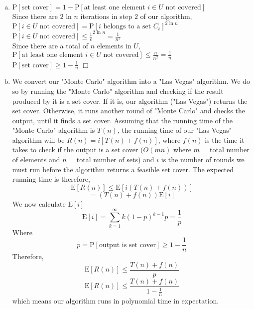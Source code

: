 \documentclass{article}[12pt]
\newenvironment{proof}{{\bf Proof.  }}{\hfill$\Box$}
\begin{document}
\begin{enumerate}[(a)]
\item
\begin{proof}
$\mathrm{P}[\text{set cover}] = 1 - \mathrm{P}[\text{at least one element } i \in U \text{ not covered}]$\\
Since there are $2$ ln $n$ iterations in step $2$ of our algorithm, \\
$\mathrm{P}[i \in U \text{ not covered}] = \mathrm{P}[i \text{ belongs to a set } C_t]^{2 \text{ ln }n}$\\
$\mathrm{P}[i \in U \text{ not covered}] \leq \frac{1}{e}^{2 \text{ ln } n} = \frac{1}{n^2}$\\
Since there are a total of $n$ elements in $U$,\\
$\mathrm{P}[\text{at least one element } i \in U \text{ not covered}] \leq \frac{n}{n^2} = \frac{1}{n}$\\
$\mathrm{P}[\text{set cover}] \geq 1 - \frac{1}{n}$
\end{proof}

\item
We convert our "Monte Carlo" algorithm into a "Las Vegas" algorithm. We do so by running the "Monte Carlo" algorithm and checking if the result produced by it is a set cover. If it is, our algorithm ("Las Vegas") returns the set cover. Otherwise, it runs another round of "Monte Carlo" and checks the output, until it finds a set cover. 
Assuming that the running time of the "Monte Carlo" algorithm is $T(n)$, the running time of our "Las Vegas" algorithm will be $R(n) = i[T(n) + f(n)]$, where $f(n)$ is the time it takes to check if the output is a set cover ($O(mn)$ where $m$ = total number of elements and $n$ = total number of sets) and $i$ is the number of rounds we must run before the algorithm returns a feasible set cover. 
The expected running time is therefore,
$$\mathrm{E}[R(n)] \leq \mathrm{E}[i(T(n) + f(n))]$$
$$= (T(n) + f(n))\mathrm{E}[i]$$
We now calculate $\mathrm{E}[i]$
$$\mathrm{E}[i] =  \sum\limits_{k=1}^{\infty}k(1-p)^{k-1}p = \frac{1}{p}$$
Where
$$ p = \mathrm{P}[\text{output is set cover}] \geq 1 - \frac{1}{n}$$
Therefore,
$$\mathrm{E}[R(n)] \leq \frac{T(n) + f(n)}{p}$$
$$\mathrm{E}[R(n)] \leq \frac{T(n) + f(n)}{1-\frac{1}{n}}$$
which means our algorithm runs in polynomial time in expectation. 

\end{enumerate}
\end{document}
